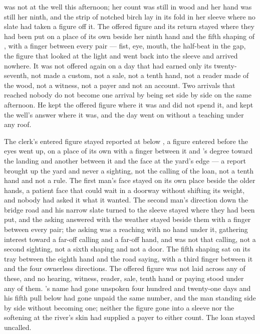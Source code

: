  was not at the well this afternoon; her count was still in wood and her hand was still her ninth, and the strip of notched birch lay in its fold in her sleeve where no slate had taken a figure off it. The offered figure and its return stayed where they had been put on a place of its own beside her ninth hand and the fifth shaping of , with a finger between every pair --- fist, eye, mouth, the half-beat in the gap, the figure that looked at the light and went back into the sleeve and arrived nowhere. It was not offered again on a day that had earned only its twenty-seventh, not made a custom, not a sale, not a tenth hand, not a reader made of the wood, not a witness, not a payer and not an account. Two arrivals that reached nobody do not become one arrival by being set side by side on the same afternoon. He kept the offered figure where it was and did not spend it, and kept the well's answer where it was, and the day went on without a teaching under any roof.

The clerk's entered figure stayed reported at  below , a figure entered before the eyes went up, on a place of its own with a finger between it and 's degree toward the landing and another between it and the face at the yard's edge --- a report brought up the yard and never a sighting, not the calling of the loan, not a tenth hand and not a rule. The first man's face stayed on its own place beside the older hands, a patient face that could wait in a doorway without shifting its weight, and nobody had asked it what it wanted. The second man's direction down the bridge road and his narrow slate turned to the sleeve stayed where they had been put, and the asking answered with the weather stayed beside them with a finger between every pair; the asking was a reaching with no hand under it, gathering interest toward a far-off calling and a far-off hand, and was not that calling, not a second sighting, not a sixth shaping and not a door. The fifth shaping sat on its tray between the eighth hand and the road saying, with a third finger between it and the four ownerless directions. The offered figure was not laid across any of these, and no hearing, witness, reader, sale, tenth hand or paying stood under any of them. 's name had gone unspoken four hundred and twenty-one days and his fifth pull below  had gone unpaid the same number,  and the man standing side by side without becoming one; neither the figure gone into a sleeve nor the softening at the river's skin had supplied a payer to either count. The loan stayed uncalled.

